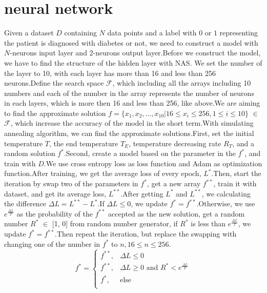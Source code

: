 \documentclass[twocolumn,10pt]{article}
\begin{document}
\section{neural network}
Given a dataset $D$ containing $N$ data points and a label with $0$ or $1$ representing the patient is diagnosed with diabetes or not, we need to construct a model with $N$-neurons input layer and 2-neurons output layer.Before we construct the model, we have to find the structure of the hidden layer with NAS.
We set the number of the layer to 10, with each layer has more than 16 and less than 256 neurons.Define the search space $\mathcal{F}$, which including all the arrays including 10 numbers and each of the number in the array represents the number of neurons in each layers, which is more then 16 and less than 256, like above.We are aiming to find the approximate solution $f= \{x_1, x_2, ..., x_{10}|16\leq x_i \leq 256, 1\leq i \leq 10\}$ $\in$ $\mathcal{F}$, which increase the accuracy of the model in the short term.With simulating annealing algorithm\cite{17235}, we can find the approximate solutions.First, set the initial temperature $T$, the end temperature $T_E$, temperature decreasing rate $R_T$, and a random solution $f^*$.Second, create a model based on the parameter in the $f^*$, and train with $D$.We use cross entropy loss as loss function and Adam as optimization function.After training, we get the average loss of every epoch, $L^*$.Then, start the iteration by swap two of the parameters in $f^*$, get a new array $f^{**}$, train it with dataset, and get its average loss, $L^{**}$.After getting $L^*$ and $L^{**}$, we calculating the difference $\Delta L = L^{**} - L^*$.If $\Delta L \leq 0$, we update $f^* = f^{**}$.Otherwise, we use $e^{\frac{\Delta L}{T}}$ as the probability of the $f^{**}$ accepted as the new solution, get a random number $R^*$ $\in$ [1, 0] from random number generator, if $R^*$ is less than $e^{\frac{\Delta L}{T}}$, we update $f^* = f^{**}$.Then repeat the iteration, but replace the swapping with changing one of the number in $f^*$ to $n, 16 \leq n \leq 256$.
 \begin{equation}
    f^* = 
    \begin{cases}
    f^{**},  &\Delta L\le 0 \\
    f^{**},  &\Delta L \ge 0 \text{ and } R^*<e^{\frac{\Delta L}{T}} \\ 
    f^{*},   &\text{else}\\
    \end{cases}
\end{equation} 
\end{document}
